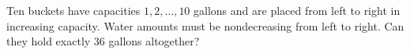 Ten buckets have capacities $1,2,\ldots,10$ gallons and are placed from left to right in increasing capacity. Water amounts must be nondecreasing from left to right. Can they hold exactly $36$ gallons altogether?
